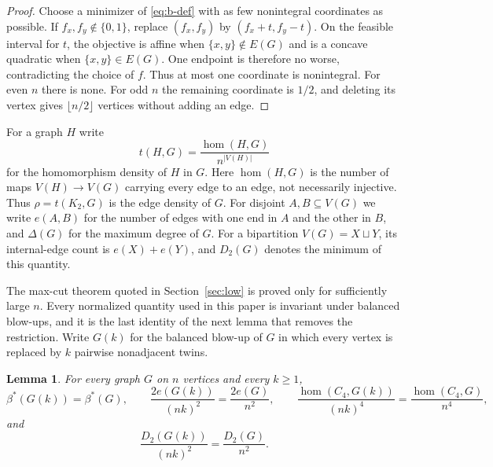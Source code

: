 \documentclass[11pt,reqno]{amsart}
\theoremstyle{plain}
\newtheorem{lemma}[theorem]{Lemma}
\newcommand{\optf}{\beta^{*}}
\newcommand{\dens}{\rho}
\begin{document}
\begin{proof}
Choose a minimizer of \eqref{eq:b-def} with as few nonintegral coordinates as
possible.  If $f_x,f_y\notin\{0,1\}$, replace $(f_x,f_y)$ by
$(f_x+t,f_y-t)$.  On the feasible interval for $t$, the objective is affine
when $\{x,y\}\notin E(G)$ and is a concave quadratic when $\{x,y\}\in E(G)$.  One
endpoint is therefore no worse, contradicting the choice of $f$.  Thus at
most one coordinate is nonintegral.  For even $n$ there is none.  For odd
$n$ the remaining coordinate is $1/2$, and deleting its vertex gives
$\lfloor n/2\rfloor$ vertices without adding an edge.
\end{proof}

For a graph $H$ write
\[
 t(H,G)=\frac{\hom(H,G)}{n^{|V(H)|}}
\]
for the homomorphism density of $H$ in $G$.  Here $\hom(H,G)$ is the number of
maps $V(H)\to V(G)$ carrying every edge to an edge, not necessarily injective.
Thus $\dens=t(K_2,G)$ is the edge density of $G$.
For disjoint $A,B\subseteq V(G)$ we write $e(A,B)$ for the number of edges with
one end in $A$ and the other in $B$, and $\Delta(G)$ for the maximum degree of
$G$.  For a bipartition $V(G)=X\sqcup Y$, its internal-edge count is
$e(X)+e(Y)$, and $D_2(G)$ denotes the minimum of this quantity.

The max-cut theorem quoted in Section~\ref{sec:low} is proved only for
sufficiently large $n$.  Every normalized quantity used in this paper is
invariant under balanced blow-ups, and it is the last identity of the next
lemma that removes the restriction.
Write $G(k)$ for the balanced blow-up of
$G$ in which every vertex is replaced by $k$ pairwise nonadjacent twins.

\begin{lemma}\label{lem:blowup}
For every graph $G$ on $n$ vertices and every $k\ge1$,
\[
 \optf(G(k))=\optf(G),\qquad
 \frac{2e(G(k))}{(nk)^{2}}=\frac{2e(G)}{n^{2}},\qquad
 \frac{\hom(C_4,G(k))}{(nk)^{4}}
 =\frac{\hom(C_4,G)}{n^{4}},
\]
and
\[
 \frac{D_2(G(k))}{(nk)^{2}}=\frac{D_2(G)}{n^{2}}.
\]
\end{lemma}
\end{document}
